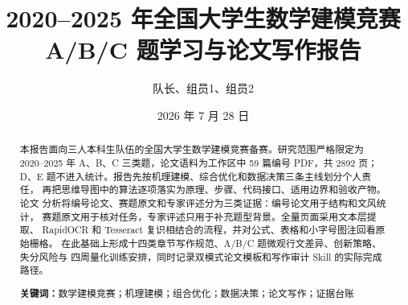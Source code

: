 \documentclass[UTF8,a4paper,12pt]{ctexart}
\title{\bfseries 2020--2025 年全国大学生数学建模竞赛\\A/B/C 题学习与论文写作报告}
\author{队长、组员1、组员2}
\date{2026 年 7 月 28 日}
\begin{document}
\maketitle

\begin{abstract}
本报告面向三人本科生队伍的全国大学生数学建模竞赛备赛。研究范围严格限定为
2020--2025 年 A、B、C 三类题，论文语料为工作区中 59 篇编号 PDF，共 2892 页；
D、E 题不进入统计。报告先按机理建模、综合优化和数据决策三条主线划分个人责任，
再把思维导图中的算法逐项落实为原理、步骤、代码接口、适用边界和验收产物。论文
分析将编号论文、赛题原文和专家评述分为三类证据：编号论文用于结构和文风统计，
赛题原文用于核对任务，专家评述只用于补充题型背景。全量页面采用文本层提取、
RapidOCR 和 Tesseract 复识相结合的流程，并对公式、表格和小字号图注回看原始栅格。
在此基础上形成十四类章节写作规范、A/B/C 题微观行文差异、创新策略、失分风险与
四周量化训练安排，同时记录双模式论文模板和写作审计 Skill 的实际完成路径。

\textbf{关键词：}数学建模竞赛；机理建模；组合优化；数据决策；论文写作；证据台账
\end{abstract}

\tableofcontents
\newpage
\end{document}
